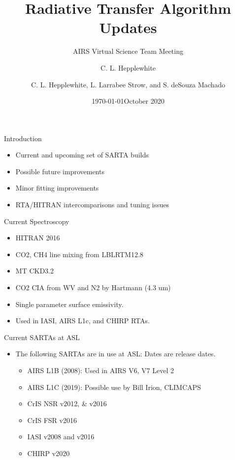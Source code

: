 \documentclass[10pt,t]{beamer}
\author{C. L. Hepplewhite}
\date{\today}
\title{\large Radiative Transfer Algorithm Updates}
\subtitle{\footnotesize{AIRS Virtual Science Team Meeting}}
\date{\vspace{0.1in}\footnotesize{October 2020 \vfill}}
\author{C. L. Hepplewhite\inst{1,2}, L. Larrabee Strow\inst{1,2}, and S. deSouza Machado\inst{1,2} }
\institute[UMBC]{\inst{1} UMBC Physics Dept. \and \inst{2}UMBC JCET}
\begin{document}
\maketitle

\begin{frame}{Introduction}
  \begin{itemize}
  \item Current and upcoming set of SARTA builds 
  \item Possible future improvements 
  \item Minor fitting improvements
  \item RTA/HITRAN intercomparisons and tuning issues
  \end{itemize}

\end{frame}
\begin{frame}{Current Spectroscopy}
  \begin{itemize}
  \item HITRAN 2016
  \item CO2, CH4 line mixing from LBLRTM12.8
  \item MT CKD3.2
  \item CO2 CIA from WV and N2 by Hartmann (4.3 um)
  \item Single parameter surface emissivity.
  \item Used in IASI, AIRS L1c, and CHIRP RTAs.
    
  \end{itemize}

\end{frame}
\begin{frame}{Current SARTAs at ASL}

  \begin{itemize}
  \item The following SARTAs are in use at ASL:
    Dates are release dates.
    \begin{itemize}
    \item AIRS L1B (2008):  Used in AIRS V6, V7 Level 2
    \item AIRS L1C (2019):  Possible use by Bill Irion, CLIMCAPS
    \item CrIS NSR v2012, \& v2016  
    \item CrIS FSR v2016
    \item IASI v2008 and v2016
    \item CHIRP v2020
    \end{itemize}
  \end{itemize}

\end{frame}
\end{document}
